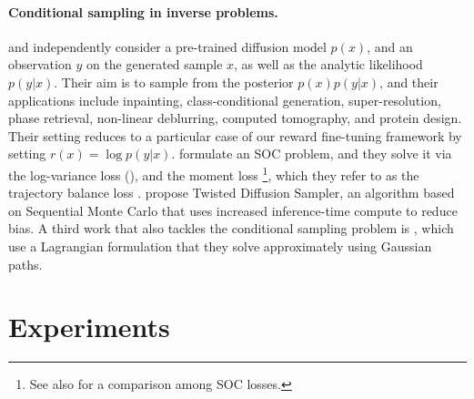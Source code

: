 \documentclass[]{fairmeta}
\begin{document}
\paragraph{Conditional sampling in inverse problems.} \cite{denker2024deft} and \cite{wu2023practical} independently consider a pre-trained diffusion model $p(x)$, and an observation $y$ on the generated sample $x$, as well as the analytic likelihood $p(y|x)$. Their aim is to sample from the posterior $p(x) p(y|x)$, and their applications include inpainting, class-conditional generation, super-resolution, phase retrieval, non-linear deblurring, computed tomography, and protein design. Their setting reduces to a particular case of our reward fine-tuning framework by setting $r(x) = \log p(y|x)$. \cite{denker2024deft} formulate an SOC problem, and they solve it via the log-variance loss (\cite{richter2020vargrad,nüsken2023solving}), and the moment loss \citep{nüsken2023solving}\footnote{See also \cite{domingoenrich2024taxonomy} for a comparison among SOC losses.}, which they refer to as the trajectory balance loss \citep{malkin2023trajectory}. \cite{wu2023practical} propose Twisted Diffusion Sampler, an algorithm based on Sequential Monte Carlo that uses increased inference-time compute to reduce bias.
A third work that also tackles the conditional sampling problem is \cite{du2024doobs}, which use a Lagrangian formulation that they solve approximately using Gaussian paths. 

\section{Experiments} \label{sec:diff_finetuning_exp}
\end{document}
